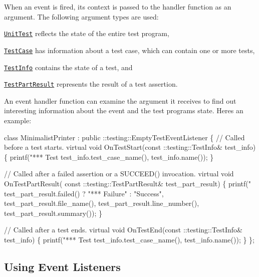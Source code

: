 When an event is fired, its context is passed to the handler function as an argument. The following argument types are used\+:
\begin{DoxyItemize}
\item \href{../include/gtest/gtest.h#L1007}{\tt Unit\+Test} reflects the state of the entire test program,
\item \href{../include/gtest/gtest.h#L689}{\tt Test\+Case} has information about a test case, which can contain one or more tests,
\item \href{../include/gtest/gtest.h#L599}{\tt Test\+Info} contains the state of a test, and
\item \href{../include/gtest/gtest-test-part.h#L42}{\tt Test\+Part\+Result} represents the result of a test assertion.
\end{DoxyItemize}

An event handler function can examine the argument it receives to find out interesting information about the event and the test program\textquotesingle{}s state. Here\textquotesingle{}s an example\+:


\begin{DoxyCode}
class MinimalistPrinter : public ::testing::EmptyTestEventListener \{
  // Called before a test starts.
  virtual void OnTestStart(const ::testing::TestInfo& test\_info) \{
    printf("*** Test %
           test\_info.test\_case\_name(), test\_info.name());
  \}

  // Called after a failed assertion or a SUCCEED() invocation.
  virtual void OnTestPartResult(
      const ::testing::TestPartResult& test\_part\_result) \{
    printf("%
           test\_part\_result.failed() ? "*** Failure" : "Success",
           test\_part\_result.file\_name(),
           test\_part\_result.line\_number(),
           test\_part\_result.summary());
  \}

  // Called after a test ends.
  virtual void OnTestEnd(const ::testing::TestInfo& test\_info) \{
    printf("*** Test %
           test\_info.test\_case\_name(), test\_info.name());
  \}
\};
\end{DoxyCode}


\subsection*{Using Event Listeners}


